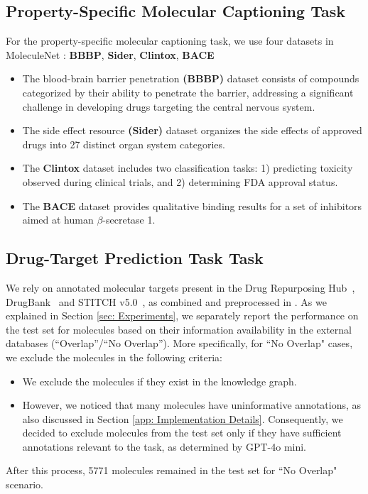 \subsection{Property-Specific Molecular Captioning Task}
For the property-specific molecular captioning task, we use four datasets in MoleculeNet \cite{wu2018moleculenet}: \textbf{BBBP}, \textbf{Sider}, \textbf{Clintox}, \textbf{BACE}
\begin{itemize}[leftmargin=.1in]
\item The blood-brain barrier penetration \textbf{(BBBP)} dataset consists of compounds categorized by their ability to penetrate the barrier, addressing a significant challenge in developing drugs targeting the central nervous system.
\item The side effect resource \textbf{(Sider)} dataset organizes the side effects of approved drugs into 27 distinct organ system categories.
\item The \textbf{Clintox} dataset includes two classification tasks: 1) predicting toxicity observed during clinical trials, and 2) determining FDA approval status.
\item The \textbf{BACE} dataset provides qualitative binding results for a set of inhibitors aimed at human $\beta$-secretase 1.
\end{itemize}

\subsection{Drug-Target Prediction Task Task}
We rely on annotated molecular targets present in the Drug Repurposing Hub~\cite{corsello2017drug}, DrugBank~\cite{wishart2018drugbank} and STITCH v5.0~\cite{szklarczyk2016stitch}, as combined and preprocessed in \citealp{zheng2023chempert}. 
As we explained in Section \ref{sec: Experiments}, 
we separately report the performance on the test set for molecules based on their information availability in the external databases (``Overlap''/``No Overlap'').
More specifically, for ``No Overlap" cases, we exclude the molecules in the following criteria:
\begin{itemize}[leftmargin=.1in]
\item We exclude the molecules if they exist in the knowledge graph.
\item However, we noticed that many molecules have uninformative annotations, as also discussed in Section \ref{app: Implementation Details}. Consequently, we decided to exclude molecules from the test set only if they have sufficient annotations relevant to the task, as determined by GPT-4o mini.
\end{itemize}
After this process, 5771 molecules remained in the test set for ``No Overlap" scenario.

